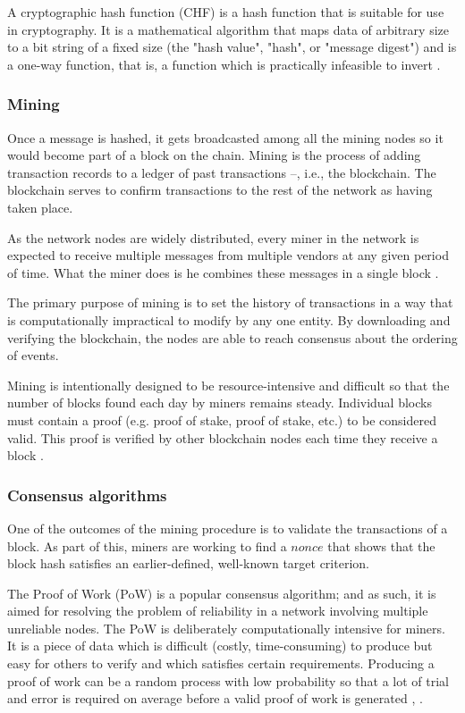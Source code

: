 \documentclass[a4paper]{article}
\begin{document}
A cryptographic hash function (CHF) is a hash function that is suitable for use in cryptography. It is a mathematical algorithm that maps data of arbitrary size to a bit string of a fixed size (the "hash value", "hash", or "message digest") and is a one-way function, that is, a function which is practically infeasible to invert \cite{CHF}.

\subsubsection{Mining}

Once a message is hashed, it gets broadcasted among all the mining nodes so it would become part of a block on the chain. Mining is the process of adding transaction records to a ledger of past transactions --, i.e., the blockchain. The blockchain serves to confirm transactions to the rest of the network as having taken place. 

As the network nodes are widely distributed, every miner in the network is expected to receive multiple messages from multiple vendors at any given period of time. What the miner does is he combines these messages in a single block \cite{tutorialspoint}.

The primary purpose of mining is to set the history of transactions in a way that is computationally impractical to modify by any one entity. By downloading and verifying the blockchain, the nodes are able to reach consensus about the ordering of events. 

Mining is intentionally designed to be resource-intensive and difficult so that the number of blocks found each day by miners remains steady. Individual blocks must contain a proof (e.g. proof of stake, proof of stake, etc.) to be considered valid. This proof is verified by other blockchain nodes each time they receive a block \cite{bitcoin_wiki}.

\subsubsection{Consensus algorithms}
One of the outcomes of the mining procedure is to validate the transactions of a block. As part of this, miners are working to find a $nonce$ that shows that the block hash satisfies an earlier-defined, well-known target criterion.

The Proof of Work (PoW) is a popular consensus algorithm; and as such, it is aimed for resolving the problem of reliability in a network involving multiple unreliable nodes. The PoW is deliberately computationally intensive for miners. It is a piece of data which is difficult (costly, time-consuming) to produce but easy for others to verify and which satisfies certain requirements. Producing a proof of work can be a random process with low probability so that a lot of trial and error is required on average before a valid proof of work is generated \cite{tutorialspoint}, \cite{bitcoin_wiki}.
\end{document}
